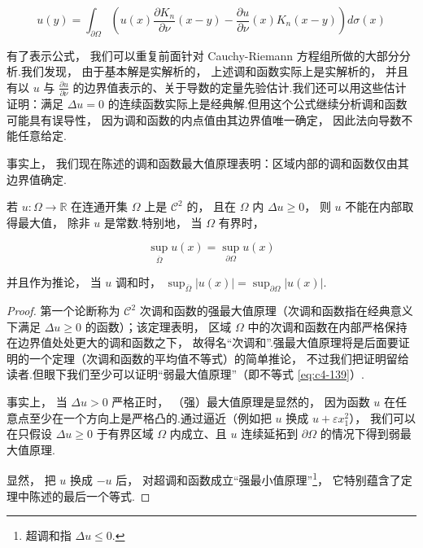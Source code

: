 \begin{proposition}\label{prop:c4-2.2}
\begin{equation}
u(y) = \int_{\partial\Omega}\left(u(x)\frac{\partial K_{n}}{\partial\nu}(x-y) - \frac{\partial u}{\partial\nu}(x)K_{n}(x-y)\right)d\sigma(x)\label{eq:c4-138}
\end{equation}
\end{proposition}

有了表示公式， 我们可以重复前面针对 Cauchy-Riemann 方程组所做的大部分分析.我们发现， 由于基本解是实解析的， 上述调和函数实际上是实解析的， 并且有以 $u$ 与 $\frac{\partial u}{\partial\nu}$ 的边界值表示的、关于导数的定量先验估计.我们还可以用这些估计证明：满足 $\Delta u = 0$ 的连续函数实际上是经典解.但用这个公式继续分析调和函数可能具有误导性， 因为调和函数的内点值由其边界值唯一确定， 因此法向导数不能任意给定.

事实上， 我们现在陈述的调和函数最大值原理表明：区域内部的调和函数仅由其边界值确定.

\begin{theorem}[最大值原理]\label{thm:c4-2.3}
若 $u : \Omega \to \mathbb{R}$ 在连通开集 $\Omega$ 上是 $\mathcal{C}^{2}$ 的， 且在 $\Omega$ 内 $\Delta u \geq 0$， 则 $u$ 不能在内部取得最大值， 除非 $u$ 是常数.特别地， 当 $\Omega$ 有界时，

\begin{equation}
\sup_{\overline{\Omega}}u(x) = \sup_{\partial\Omega}u(x)\label{eq:c4-139}
\end{equation}

并且作为推论， 当 $u$ 调和时， $\sup_{\overline{\Omega}}|u(x)| = \sup_{\partial\Omega}|u(x)|$.
\end{theorem}

\begin{proof}
第一个论断称为 $\mathcal{C}^{2}$ 次调和函数的强最大值原理（次调和函数指在经典意义下满足 $\Delta u \geq 0$ 的函数）；该定理表明， 区域 $\Omega$ 中的次调和函数在内部严格保持在边界值处处更大的调和函数之下， 故得名``次调和''.强最大值原理将是后面要证明的一个定理（次调和函数的平均值不等式）的简单推论， 不过我们把证明留给读者.但眼下我们至少可以证明``弱最大值原理''（即不等式 \eqref{eq:c4-139}）.

事实上， 当 $\Delta u > 0$ 严格正时， （强）最大值原理是显然的， 因为函数 $u$ 在任意点至少在一个方向上是严格凸的.通过逼近（例如把 $u$ 换成 $u + \varepsilon x_{1}^{2}$）， 我们可以在只假设 $\Delta u \geq 0$ 于有界区域 $\Omega$ 内成立、且 $u$ 连续延拓到 $\partial\Omega$ 的情况下得到弱最大值原理.

显然， 把 $u$ 换成 $-u$ 后， 对超调和函数成立``强最小值原理''\footnote{超调和指 $\Delta u \leq 0$.}， 它特别蕴含了定理中陈述的最后一个等式.
\end{proof}

